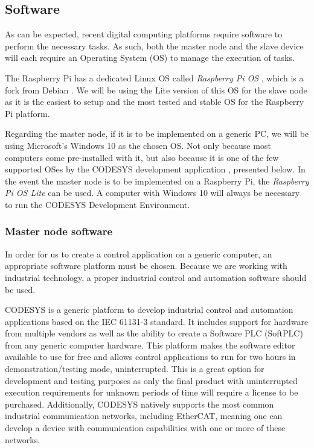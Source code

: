 \subsection{Software} \label{sec:proposed-software}

As can be expected, recent digital computing platforms require software to perform the necessary tasks.
As such, both the master node and the slave device will each require an Operating System (OS) to manage the execution of tasks.

The Raspberry Pi has a dedicated Linux OS called \emph{Raspberry Pi OS} \cite{os:raspberry-pi-os}, which is a fork from Debian \cite{os:debian}.
We will be using the Lite version of this OS for the slave node as it is the easiest to setup and the most tested and stable OS for the Raspberry Pi platform.

Regarding the master node, if it is to be implemented on a generic PC, we will be using Microsoft's Windows 10\texttrademark{} \cite{os:windows-10} as the chosen OS.
Not only because most computers come pre-installed with it, but also because it is one of the few supported OSes by the CODESYS development application \cite{ide:codesys}, presented below.
In the event the master node is to be implemented on a Raspberry Pi, the \emph{Raspberry Pi OS Lite} can be used.
A computer with Windows 10 will always be necessary to run the CODESYS Development Environment.

\subsubsection{Master node software}

In order for us to create a control application on a generic computer, an appropriate software platform must be chosen.
Because we are working with industrial technology, a proper industrial control and automation software should be used.

CODESYS is a generic platform to develop industrial control and automation applications based on the IEC 61131-3 standard.
It includes support for hardware from multiple vendors as well as the ability to create a Software PLC (SoftPLC) from any generic computer hardware.
This platform makes the software editor available to use for free and allows control applications to run for two hours in demonstration/testing mode, uninterrupted.
This is a great option for development and testing purposes as only the final product with uninterrupted execution requirements for unknown periods of time will require a license to be purchased.
Additionally, CODESYS natively supports the most common industrial communication networks, including EtherCAT, meaning one can develop a device with communication capabilities with one or more of these networks.

